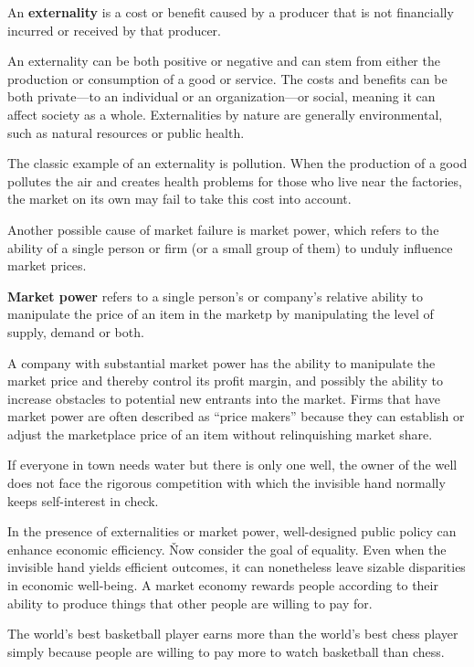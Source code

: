 \bd[Externality]
An \textbf{externality} is a cost or benefit caused by a producer that is not financially incurred or received by that
producer.
\ed

An externality can be both positive or negative and can stem from either the production or consumption of a good or
service. The costs and benefits can be both private—to an individual or an organization—or social, meaning it can
affect society as a whole. Externalities by nature are generally environmental, such as natural resources or public
health.

\be
The classic example of an externality is pollution. When the production of a good pollutes the air and creates health
problems for those who live near the factories, the market on its own may fail to take this cost into account.
\ee

Another possible cause of market failure is market power, which refers to the ability of a single person or firm (or
a small group of them) to unduly influence market prices.

\textbf{Market power} refers to a single person's or company's relative ability to manipulate the price of an item in
the marketp by manipulating the level of supply, demand or both.
\ed

A company with substantial market power has the ability to manipulate the market price and thereby control its profit
margin, and possibly the ability to increase obstacles to potential new entrants into the market. Firms that have
market power are often described as ``price makers'' because they can establish or adjust the marketplace price of an
item without relinquishing market share.

\be
If everyone in town needs water but there is only one well, the owner of the well does not face the rigorous
competition with which the invisible hand normally keeps self-interest in check.
\ee

In the presence of externalities or market power, well-designed public policy can enhance economic efficiency. \v

Now consider the goal of equality. Even when the invisible hand yields efficient outcomes, it can nonetheless leave
sizable disparities in economic well-being. A market economy rewards people according to their ability to produce
things that other people are willing to pay for.

\be
The world's best basketball player earns more than the world's best chess player simply because people are willing to
pay more to watch basketball than chess.
\ee

